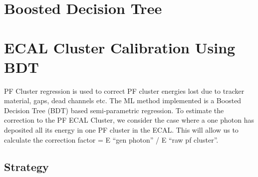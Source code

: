 




\section{Boosted Decision Tree}
\section{ECAL Cluster Calibration Using BDT}

PF Cluster regression is used to correct PF cluster energies lost due to tracker material, gaps, dead channels etc. The ML method implemented is a Boosted Decision Tree (BDT) based semi-parametric regression. To estimate the correction to the PF ECAL Cluster, we consider the case where a one photon has deposited all its energy in one PF cluster in the ECAL. This will allow us to calculate the correction factor = E “gen photon” / E “raw pf cluster”. 

\subsection{Strategy}

